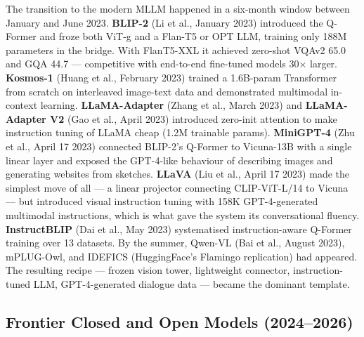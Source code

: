 The transition to the modern MLLM happened in a six-month window between January and June 2023. \textbf{BLIP-2} (Li et al., January 2023) introduced the Q-Former and froze both ViT-g and a Flan-T5 or OPT LLM, training only 188M parameters in the bridge. With FlanT5-XXL it achieved zero-shot VQAv2 65.0 and GQA 44.7 --- competitive with end-to-end fine-tuned models 30× larger. \textbf{Kosmos-1} (Huang et al., February 2023) trained a 1.6B-param Transformer from scratch on interleaved image-text data and demonstrated multimodal in-context learning. \textbf{LLaMA-Adapter} (Zhang et al., March 2023) and \textbf{LLaMA-Adapter V2} (Gao et al., April 2023) introduced zero-init attention to make instruction tuning of LLaMA cheap (1.2M trainable params). \textbf{MiniGPT-4} (Zhu et al., April 17 2023) connected BLIP-2's Q-Former to Vicuna-13B with a single linear layer and exposed the GPT-4-like behaviour of describing images and generating websites from sketches. \textbf{LLaVA} (Liu et al., April 17 2023) made the simplest move of all --- a linear projector connecting CLIP-ViT-L/14 to Vicuna --- but introduced visual instruction tuning with 158K GPT-4-generated multimodal instructions, which is what gave the system its conversational fluency. \textbf{InstructBLIP} (Dai et al., May 2023) systematised instruction-aware Q-Former training over 13 datasets. By the summer, Qwen-VL (Bai et al., August 2023), mPLUG-Owl, and IDEFICS (HuggingFace's Flamingo replication) had appeared. The resulting recipe --- frozen vision tower, lightweight connector, instruction-tuned LLM, GPT-4-generated dialogue data --- became the dominant template.

\subsection{Frontier Closed and Open Models (2024--2026)}\label{frontier-closed-and-open-models-20242026}

